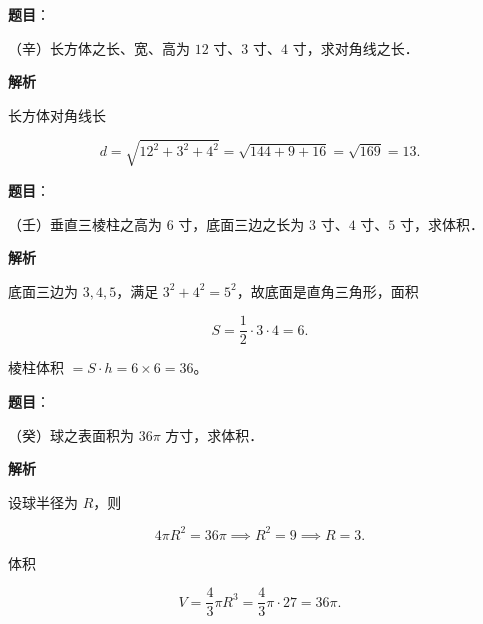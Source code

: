 \begin{answer}

\textbf{题目}：

（辛）长方体之长、宽、高为 $12$ 寸、$3$ 寸、$4$ 寸，求对角线之长．

\textbf{解析}

长方体对角线长

\nopagebreak[4]
\[
d=\sqrt{12^2+3^2+4^2}=\sqrt{144+9+16}=\sqrt{169}=13.
\]


\end{answer}
\begin{answer}

\textbf{题目}：

（壬）垂直三棱柱之高为 $6$ 寸，底面三边之长为 $3$ 寸、$4$ 寸、$5$ 寸，求体积．

\textbf{解析}

底面三边为 $3,4,5$，满足 $3^2+4^2=5^2$，故底面是直角三角形，面积

\nopagebreak[4]
\[
S=\frac12\cdot3\cdot4=6.
\]

棱柱体积 $=S\cdot h=6\times6=36$。


\end{answer}
\begin{answer}

\textbf{题目}：

（癸）球之表面积为 $36\pi$ 方寸，求体积．

\textbf{解析}

设球半径为 $R$，则

\nopagebreak[4]
\[
4\pi R^2=36\pi\implies R^2=9\implies R=3.
\]

体积

\nopagebreak[4]
\[
V=\frac43\pi R^3=\frac43\pi\cdot27=36\pi.
\]


\par\medskip

\end{answer}

